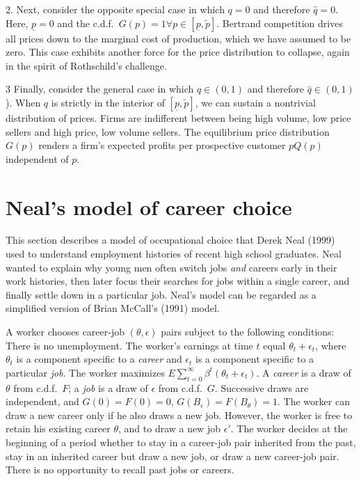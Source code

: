 \item{2.} Next, consider the opposite special case in which $q=0$ and therefore $\hat q = 0$.  Here, $\underline p = 0$ and the c.d.f.~$G(p) = 1 \forall p \in [\underline p, \tilde p]$.
Bertrand competition drives all prices down to the marginal cost of production, which we have assumed to be zero.
  This case exhibits another force for the price distribution
to collapse, again in the spirit of Rothschild's challenge. %

\item{3} Finally, consider the general case in which $q \in (0, 1)$ and therefore $\hat q \in (0,1)$).  When $q$ is strictly in the interior of $[\underline p, \tilde p]$, we can sustain a nontrivial
distribution of prices.  Firms are indifferent between being high volume, low price sellers and high price, low volume sellers.
The equilibrium price distribution $G(p)$ renders a firm's expected profits per prospective customer $p Q(p)$ independent
of $p$.


\medskip



\section{Neal's model of career choice}

%
This section describes a model of occupational choice that
Derek Neal (1999) used to understand  employment histories
of recent high school graduates.   Neal wanted to explain
why young men often switch jobs {\it and\/} careers  early in their
work histories, then later focus their searches for  jobs within a single
career, and finally settle down in a particular
job. Neal's model  can be regarded
as a simplified version of Brian McCall's (1991) model.

 A worker chooses career-job $(\theta,\epsilon)$ pairs
subject to the following conditions:  There is no
unemployment.  The worker's earnings
at time $t$ equal $\theta_t + \epsilon_t$, where $\theta_t$ is a component specific to a {\it career\/}
and ${\epsilon_t}$ is a component specific to a particular {\it job}.  The worker
maximizes $E \sum_{t=0}^\infty  \beta^t (\theta_t + \epsilon_t).$
A {\it career\/} is a draw
of $\theta$ from  c.d.f.\  $F$; a {\it job\/} is a draw of
$\epsilon$ from c.d.f.\ $G$.   Successive draws are independent,
and $G(0)=F(0)=0$, $G(B_\epsilon)= F(B_\theta)=1$.  The
worker can draw a new career only if he also draws a
new job.
 However, the worker is free to retain his existing
career $\theta$, and to draw a new job $\epsilon'$.  The worker
decides at the beginning of a period whether to stay in a
career-job pair inherited from the past, stay in an inherited career but
draw  a new job, or  draw a new career-job pair.  There is
no opportunity to  recall  past jobs or careers.

